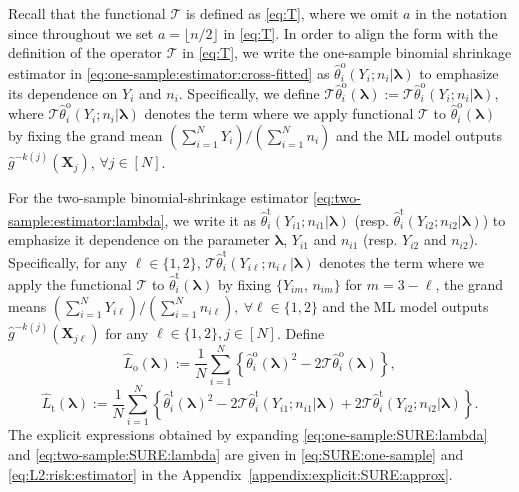\documentclass[12pt,letterpaper]{article}
\begin{document}
Recall that the functional $\mathcal{T}$ is defined as \eqref{eq:T}, where we omit $a$ in the notation since throughout we set $a=\lfloor n/2\rfloor$ in \eqref{eq:T}. In order to align the form with the definition of the operator $\mathcal{T}$ in \eqref{eq:T}, we write the one-sample binomial shrinkage estimator in \eqref{eq:one-sample:estimator:cross-fitted} as $\hat{\theta}_i^{\mathrm{o}}(Y_i;n_i| \boldsymbol{\lambda})$ to emphasize its dependence on $Y_i$ and $n_i$. Specifically, we define $\mathcal{T}\hat{\theta}_i^{\mathrm{o}}(\boldsymbol{\lambda}):=\mathcal{T}\hat{\theta}_i^{\mathrm{o}}(Y_i;n_i|\boldsymbol{\lambda})$, where $\mathcal{T}\hat{\theta}_i^{\mathrm{o}}(Y_i;n_i|\boldsymbol{\lambda})$ denotes the term where we apply functional $\mathcal{T}$ to $\hat{\theta}_i^{\mathrm{o}}(\boldsymbol{\lambda})$ by fixing the grand mean $(\sum_{i=1}^NY_i)/(\sum_{i=1}^Nn_i)$ and the ML model outputs $\hat{g}^{-k(j)}(\mathbf{X}_j)$, $\forall j\in[N]$. 

For the two-sample binomial-shrinkage estimator \eqref{eq:two-sample:estimator:lambda}, we write it as $\hat{\theta}_i^{\mathrm{t}}(Y_{i1};n_{i1}|\boldsymbol{\lambda})$ (resp. $\hat{\theta}_i^{\mathrm{t}}(Y_{i2};n_{i2}|\boldsymbol{\lambda})$) to emphasize it dependence on the parameter $\boldsymbol{\lambda}$, $Y_{i1}$ and $n_{i1}$ (resp. $Y_{i2}$ and $n_{i2}$). Specifically, for any $\ell\in\{1,2\}$, $\mathcal{T}\hat{\theta}_i^{\mathrm{t}}(Y_{i\ell};n_{i\ell}|\boldsymbol{\lambda})$ denotes the term where we apply the functional $\mathcal{T}$ to $\hat{\theta}_i^{\mathrm{t}}(\boldsymbol{\lambda})$ by fixing $\{Y_{im}$, $n_{im}\}$ for $m=3-\ell$, the grand means $(\sum_{i=1}^NY_{i\ell})/(\sum_{i=1}^Nn_{i\ell}),\ \forall\ell\in\{1,2\}$ and the ML model outputs $\hat{g}^{-k(j)}(\mathbf{X}_{j\ell})$ for any $\ell\in\{1,2\}, j\in[N]$. 
Define 
\begin{equation}\label{eq:one-sample:SURE:lambda}
    \hat{L}_{\mathrm{o}}(\boldsymbol{\lambda}):=\frac{1}{N}\sum_{i=1}^{N}\left\{\hat{\theta}_i^{\mathrm{o}}(\boldsymbol{\lambda})^2-2\mathcal{T}\hat{\theta}_i^{\mathrm{o}}(\boldsymbol{\lambda})\right\},
\end{equation}
\begin{equation}\label{eq:two-sample:SURE:lambda}
    \hat{L}_{\mathrm{t}}(\boldsymbol{\lambda}):=\frac{1}{N}\sum_{i=1}^{N}\left\{\hat{\theta}_i^{\mathrm{t}}(\boldsymbol{\lambda})^2-2\mathcal{T}\hat{\theta}_{i}^{\mathrm{t}}(Y_{i1};n_{i1}|\boldsymbol{\lambda})+2\mathcal{T}\hat{\theta}_{i}^{\mathrm{t}}(Y_{i2};n_{i2}|\boldsymbol{\lambda})\right\}.
\end{equation}
The explicit expressions obtained by expanding \eqref{eq:one-sample:SURE:lambda} and \eqref{eq:two-sample:SURE:lambda} are given in \eqref{eq:SURE:one-sample} and \eqref{eq:L2:risk:estimator} in the Appendix~\ref{appendix:explicit:SURE:approx}. 
\end{document}
